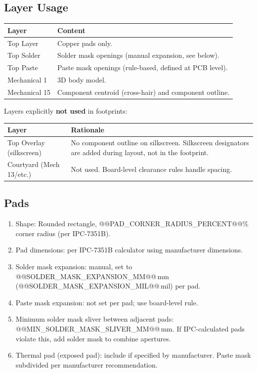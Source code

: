 \documentclass[11pt,a4paper]{article}
\begin{document}
\subsection{Layer Usage}

\begin{tabular}{@{}lL{9cm}@{}}
\toprule
Layer & Content \\
\midrule
Top Layer        & Copper pads only. \\
Top Solder       & Solder mask openings (manual expansion, see below). \\
Top Paste        & Paste mask openings (rule-based, defined at PCB level). \\
Mechanical 1     & 3D body model. \\
Mechanical 15    & Component centroid (cross-hair) and component outline. \\
\bottomrule
\end{tabular}

Layers explicitly \textbf{not used} in footprints:

\begin{tabular}{@{}lL{9cm}@{}}
\toprule
Layer & Rationale \\
\midrule
Top Overlay (silkscreen) & No component outline on silkscreen. Silkscreen designators are added during layout, not in the footprint. \\
Courtyard (Mech 13/etc.) & Not used. Board-level clearance rules handle spacing. \\
\bottomrule
\end{tabular}

\subsection{Pads}

\begin{enumerate}[nosep]
  \item Shape: Rounded rectangle, @@PAD_CORNER_RADIUS_PERCENT@@\% corner radius (per IPC-7351B).
  \item Pad dimensions: per IPC-7351B calculator using manufacturer dimensions.
  \item Solder mask expansion: manual, set to @@SOLDER_MASK_EXPANSION_MM@@\,mm (@@SOLDER_MASK_EXPANSION_MIL@@\,mil) per pad.
  \item Paste mask expansion: not set per pad; use board-level rule.
  \item Minimum solder mask sliver between adjacent pads: @@MIN_SOLDER_MASK_SLIVER_MM@@\,mm. If IPC-calculated pads violate this, add solder mask to combine apertures.
  \item Thermal pad (exposed pad): include if specified by manufacturer. Paste mask subdivided per manufacturer recommendation.
\end{enumerate}
\end{document}
